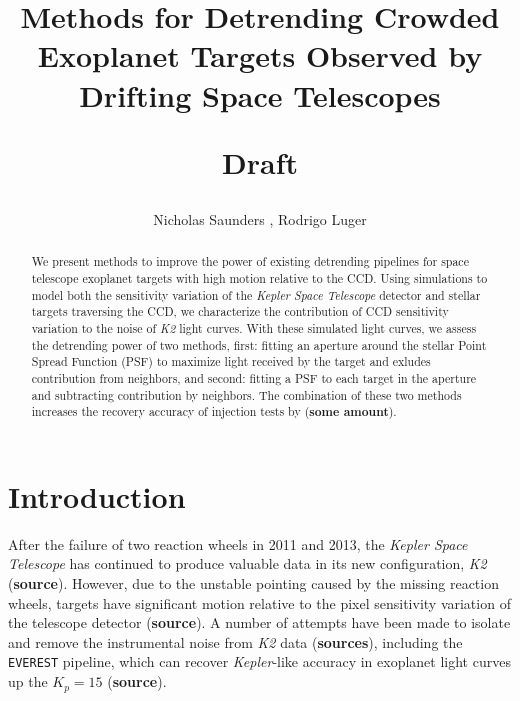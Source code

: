 \documentclass[12pt,preprint]{aastex}
\begin{document}
\title{
	Methods for Detrending Crowded Exoplanet Targets Observed by Drifting Space Telescopes
	\begin{center}
		\textbf{Draft}
	\end{center}
}

\author{Nicholas Saunders , Rodrigo Luger }



\begin{abstract}

We present methods to improve the power of existing detrending pipelines for space telescope exoplanet targets with high motion relative to the CCD. Using simulations to model both the sensitivity variation of the \textit{Kepler Space Telescope} detector and stellar targets traversing the CCD, we characterize the contribution of CCD sensitivity variation to the noise of \textit{K2} light curves. With these simulated light curves, we assess the detrending power of two methods, first: fitting an aperture around the stellar Point Spread Function (PSF) to maximize light received by the target and exludes contribution from neighbors, and second: fitting a PSF to each target in the aperture and subtracting contribution by neighbors. The combination of these two methods increases the recovery accuracy of injection tests by (\textbf{some amount}).

\end{abstract}

\section{Introduction}

After the failure of two reaction wheels in 2011 and 2013, the \textit{Kepler Space Telescope} has continued to produce valuable data in its new configuration, \textit{K2} (\textbf{source}). However, due to the unstable pointing caused by the missing reaction wheels, targets have significant motion relative to the pixel sensitivity variation of the telescope detector (\textbf{source}). A number of attempts have been made to isolate and remove the instrumental noise from \textit{K2} data (\textbf{sources}), including the \texttt{EVEREST} pipeline, which can recover \textit{Kepler}-like accuracy in exoplanet light curves up the $K_p = 15$ (\textbf{source}).
\end{document}
